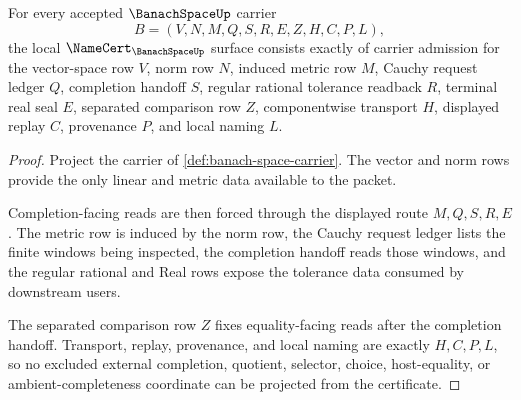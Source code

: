 \begin{theorem}
\label{thm:banach-space-namecert-obligations}
For every accepted $\BanachSpaceUp$ carrier
$$
B=(V,N,M,Q,S,R,E,Z,H,C,P,L),
$$
the local $\NameCert_{\BanachSpaceUp}$ surface consists exactly of carrier admission for the vector-space row $V$, norm row $N$, induced metric row $M$, Cauchy request ledger $Q$, completion handoff $S$, regular rational tolerance readback $R$, terminal real seal $E$, separated comparison row $Z$, componentwise transport $H$, displayed replay $C$, provenance $P$, and local naming $L$.
\end{theorem}
\begin{proof}
Project the carrier of \autoref{def:banach-space-carrier}. The vector and norm rows provide the only linear and metric data available to the packet.

Completion-facing reads are then forced through the displayed route $M,Q,S,R,E$. The metric row is induced by the norm row, the Cauchy request ledger lists the finite windows being inspected, the completion handoff reads those windows, and the regular rational and Real rows expose the tolerance data consumed by downstream users.

The separated comparison row $Z$ fixes equality-facing reads after the completion handoff. Transport, replay, provenance, and local naming are exactly $H,C,P,L$, so no excluded external completion, quotient, selector, choice, host-equality, or ambient-completeness coordinate can be projected from the certificate.
\end{proof}

